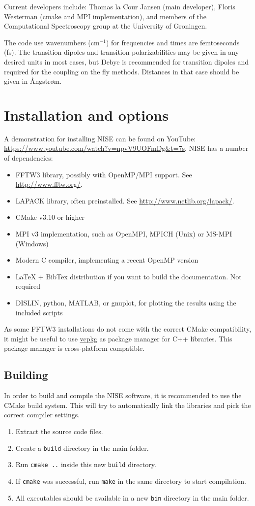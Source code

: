 \documentclass[12pt]{book}
\begin{document}
Current developers include: Thomas la Cour Jansen (main developer), Floris Westerman (cmake and MPI implementation), and members of the Computational Spectroscopy group at the University of Groningen.

The code use wavenumbers (cm$^{-1}$) for frequencies and times are femtoseconds (fs). The transition
dipoles and transition polarizabilities may be given in any desired units in most cases, but Debye is recommended for transition dipoles and required for the coupling on the fly methods. Distances in that case should be given in Ångstrøm.

\chapter{Installation and options}
A demonstration for installing NISE can be found on YouTube: \url{https://www.youtube.com/watch?v=npvV9UOFmDg&t=7s}.
NISE has a number of dependencies:
\begin{itemize}
\item FFTW3 library, possibly with OpenMP/MPI support. See \url{http://www.fftw.org/}.
\item LAPACK library, often preinstalled. See \url{http://www.netlib.org/lapack/}.
\item CMake v3.10 or higher
\item MPI v3 implementation, such as OpenMPI, MPICH (Unix) or MS-MPI (Windows)
\item Modern C compiler, implementing a recent OpenMP version
\item LaTeX + BibTex distribution if you want to build the documentation. Not required
\item DISLIN, python, MATLAB, or gnuplot, for plotting the results using the included scripts
\end{itemize}
As some FFTW3 installations do not come with the correct CMake compatibility, it might be useful to use \href{https://github.com/microsoft/vcpkg}{vcpkg} as package manager for C++ libraries. This package manager is cross-platform compatible.

\section{Building}
In order to build and compile the NISE software, it is recommended to use the CMake build system. This will try to automatically link the libraries and pick the correct compiler settings.
\begin{enumerate}
\item Extract the source code files.
\item Create a \texttt{build} directory in the main folder.
\item Run \texttt{cmake ..} inside this new {\tt build} directory.
\item If {\tt cmake} was successful, run {\tt make} in the same directory to start compilation.
\item All executables should be available in a new {\tt bin} directory in the main folder.
\end{enumerate}
\end{document}
